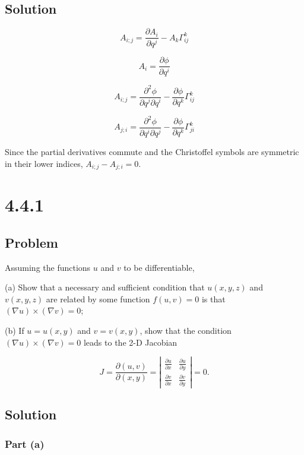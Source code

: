 \documentclass[12pt]{article}
\begin{document}
\subsection{Solution}

\[
    A_{i ; j} = \frac{\partial A_i}{\partial q^j} - A_k \Gamma_{i j}^k
\]

\[
    A_i = \frac{\partial \phi}{\partial q^i}
\]

\[
    A_{i ; j} = \frac{\partial^2 \phi}{\partial q^j \partial q^i} - \frac{\partial \phi}{\partial q^k} \Gamma_{i j}^k
\]

\[
    A_{j ; i} = \frac{\partial^2 \phi}{\partial q^i \partial q^j} - \frac{\partial \phi}{\partial q^k} \Gamma_{j i}^k
\]

Since the partial derivatives commute and the Christoffel symbols are symmetric in their lower indices, \(A_{i ; j} - A_{j ; i} = 0\).

\newpage
\section{4.4.1}

\subsection{Problem}

Assuming the functions \(u\) and \(v\) to be differentiable,

(a) Show that a necessary and sufficient condition that \(u(x, y, z)\) and \(v(x, y, z)\) are related by some function \(f(u, v)=0\) is that \((\nabla u) \times(\nabla v)=0\);

(b) If \(u=u(x, y)\) and \(v=v(x, y)\), show that the condition \((\nabla u) \times(\nabla v)=0\) leads to the 2-D Jacobian

\[
    J=\frac{\partial(u, v)}{\partial(x, y)}=\left|\begin{array}{ll}
        \frac{\partial u}{\partial x} & \frac{\partial u}{\partial y} \\
        \frac{\partial v}{\partial x} & \frac{\partial v}{\partial y}
    \end{array}\right|=0 .
\]

\subsection{Solution}

\subsubsection{Part (a)}
\end{document}
